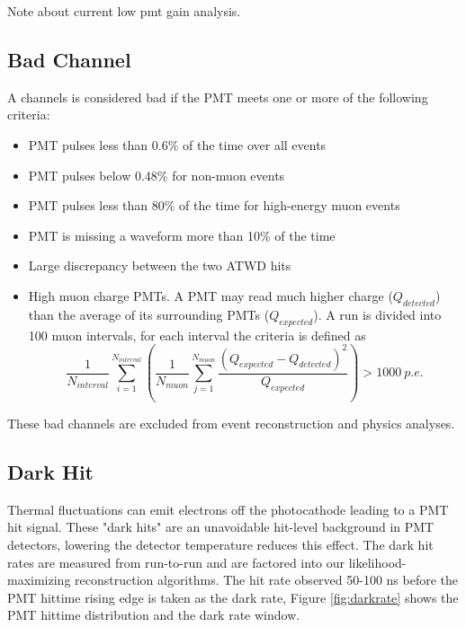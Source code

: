 Note about current low pmt gain analysis.

\subsection*{Bad Channel}
A channels is considered bad if the PMT meets one or more of the following criteria:
\begin{itemize}
	\item PMT pulses less than 0.6\% of the time over all events
	\item PMT pulses below 0.48\% for non-muon events
	\item PMT pulses less than 80\% of the time for high-energy muon events
	\item PMT is missing a waveform more than 10\% of the time
	\item Large discrepancy between the two ATWD hits
	\item High muon charge PMTs. A PMT may read much higher charge ($Q_{detected}$) than the average of its surrounding PMTs ($Q_{expected}$). A run is divided into 100 muon intervals, for each interval the criteria is defined as
	\[\frac{1}{N_{interval}}\sum_{i=1}^{N_{interval}}\left(\frac{1}{N_{muon}}\sum_{j=1}^{N_{muon}}\frac{(Q_{expected}-Q_{detected})^2}{Q_{expected}}\right)>1000\ p.e.\]
\end{itemize}
These bad channels are excluded from event reconstruction and physics analyses.

\subsection*{Dark Hit}
Thermal fluctuations can emit electrons off the photocathode leading to a PMT hit signal. These "dark hits" are an unavoidable hit-level background in PMT detectors, lowering the detector temperature reduces this effect. The dark hit rates are measured from run-to-run and are factored into our likelihood-maximizing reconstruction algorithms. The hit rate observed 50-100 ns before the PMT hittime rising edge is taken as the dark rate, Figure \ref{fig:darkrate} shows the PMT hittime distribution and the dark rate window.

